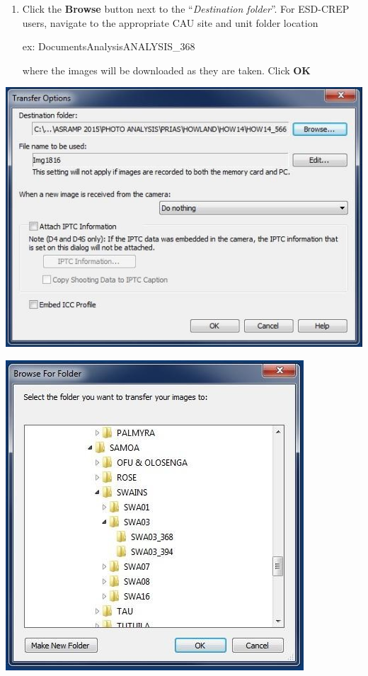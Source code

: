 \documentclass[]{book}
\begin{document}
\begin{enumerate}
\def\labelenumi{\arabic{enumi}.}
\setcounter{enumi}{7}
\item
  Click the \textbf{Browse} button next to the ``\emph{Destination folder}''. For ESD-CREP users, navigate to the appropriate CAU site and unit folder location

  ex: Documents\CAU Analysis\PHOTO ANALYSIS\SAMOA\SWAINS{}\_368

  where the images will be downloaded as they are taken. Click \textbf{OK}
\end{enumerate}

\includegraphics{images/Camera12.jpg}

\includegraphics{images/Camera13.jpg}
\end{document}
